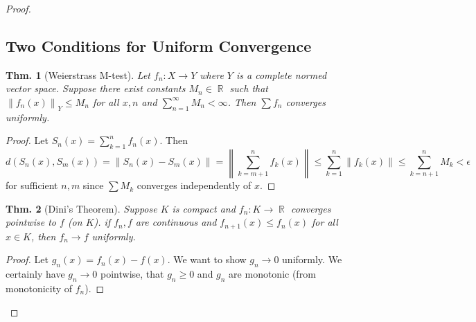 \documentclass[12pt, a4paper]{book}
\DeclareMathOperator{\R}{\mathbb{R}}
\newcommand{\norm}[1]{\left\lVert#1\right\rVert} %
\newtheorem{theorem}{Thm.}[section]
\theoremstyle{nonumberplain}
\newtheorem{proof}{Proof}
\begin{document}
\begin{proof}
\subsection{Two Conditions for Uniform Convergence}
\begin{theorem}[Weierstrass M-test]
    Let $f_n:X\to Y$ where $Y$ is a complete normed vector space. Suppose there exist constants $M_n\in\R$ such that
    $\norm{f_n(x)}_Y\leq M_n$ for all $x,n$ and $\sum\limits_{n=1}^\infty M_n<\infty$. Then $\sum f_n$ converges
    uniformly.
\end{theorem}
\begin{proof}
    Let $S_n(x)=\sum\limits_{k=1}^n f_n(x)$. Then
    \[d(S_n(x),S_m(x))=\norm{S_n(x)-S_m(x)}=\norm{\sum\limits_{k=m+1}^n f_k(x)}\leq\sum\limits_{k=1}^n\norm{f_k(x)}\leq\sum\limits_{k=n+1}^n M_k<\epsilon\]
    for sufficient $n,m$ since $\sum M_k$ converges independently of $x$.
\end{proof}
\begin{theorem}[Dini's Theorem]
    Suppose $K$ is compact and $f_n:K\to\R$ converges pointwise to $f$ (on $K$). if $f_n,f$ are continuous and $f_{n+1}(x)\leq f_n(x)$
    for all $x\in K$, then $f_n\to f$ uniformly.
\end{theorem}
\begin{proof}
    Let $g_n(x)=f_n(x)-f(x)$.
    We want to show $g_n\to 0$ uniformly.
    We certainly have $g_n\to 0$ pointwise, that $g_n\geq 0$ and $g_n$ are monotonic (from monotonicity of $f_n$).


\end{proof}
\end{proof}
\end{document}
